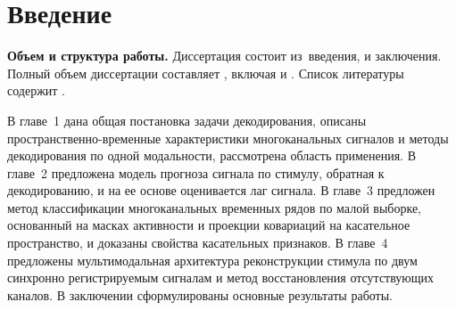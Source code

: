 \chapter*{Введение}                         %

\newcommand{\actuality}{}
\newcommand{\progress}{}
\newcommand{\aim}{{\textbf\aimTXT}}
\newcommand{\tasks}{\textbf{\tasksTXT}}
\newcommand{\object}{{\textbf\objectTXT}}
\newcommand{\subject}{{\textbf\subjectTXT}}
\newcommand{\novelty}{\textbf{\noveltyTXT}}
\newcommand{\tinfluence}{\textbf{\tinfluenceTXT}}
\newcommand{\pinfluence}{\textbf{\pinfluenceTXT}}
\newcommand{\methods}{\textbf{\methodsTXT}}
\newcommand{\defpositions}{\textbf{\defpositionsTXT}}
\newcommand{\passport}{{\textbf\passportTXT}}
\newcommand{\reliability}{\textbf{\reliabilityTXT}}
\newcommand{\probation}{\textbf{\probationTXT}}
\newcommand{\contribution}{\textbf{\contributionTXT}}
\newcommand{\publications}{\textbf{\publicationsTXT}}


\textbf{Объем и структура работы.} Диссертация состоит из~введения,
 и заключения.
%
Полный объем диссертации составляет
, включая
 и
.
Список литературы содержит .

В главе~1 дана общая постановка задачи декодирования, описаны пространственно-временные характеристики многоканальных сигналов и методы декодирования по одной модальности, рассмотрена область применения. В главе~2 предложена модель прогноза сигнала по стимулу, обратная к декодированию, и на ее основе оценивается лаг сигнала. В главе~3 предложен метод классификации многоканальных временных рядов по малой выборке, основанный на масках активности и проекции ковариаций на касательное пространство, и доказаны свойства касательных признаков. В главе~4 предложены мультимодальная архитектура реконструкции стимула по двум синхронно регистрируемым сигналам и метод восстановления отсутствующих каналов. В заключении сформулированы основные результаты работы.
